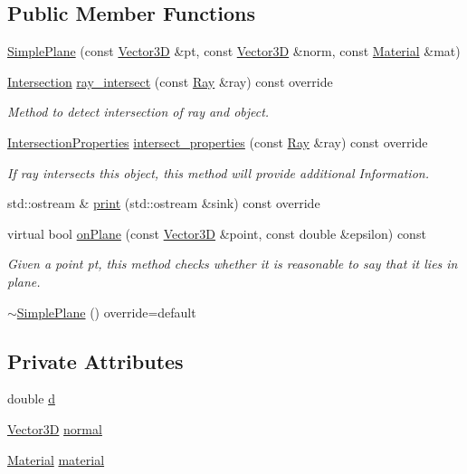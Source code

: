 \subsection*{Public Member Functions}
\begin{DoxyCompactItemize}
\item 
\hyperlink{classSimplePlane_a4536573a977f9d4c30334f9c4aab6a1d}{Simple\+Plane} (const \hyperlink{classVector3D}{Vector3D} \&pt, const \hyperlink{classVector3D}{Vector3D} \&norm, const \hyperlink{classMaterial}{Material} \&mat)
\item 
\hyperlink{classIntersection}{Intersection} \hyperlink{classSimplePlane_adffd7f102bed30d44cd527cb34a3a312}{ray\+\_\+intersect} (const \hyperlink{classRay}{Ray} \&ray) const override
\begin{DoxyCompactList}\small\item\em Method to detect intersection of ray and object. \end{DoxyCompactList}\item 
\hyperlink{classIntersectionProperties}{Intersection\+Properties} \hyperlink{classSimplePlane_a29180f657d6932226dc91ebe92143608}{intersect\+\_\+properties} (const \hyperlink{classRay}{Ray} \&ray) const override
\begin{DoxyCompactList}\small\item\em If ray intersects this object, this method will provide additional Information. \end{DoxyCompactList}\item 
std\+::ostream \& \hyperlink{classSimplePlane_afc8014126bb264e11e7b2b470a8a90a1}{print} (std\+::ostream \&sink) const override
\item 
virtual bool \hyperlink{classSimplePlane_a74bbd8b10263fe1df821d8479f1ab5ef}{on\+Plane} (const \hyperlink{classVector3D}{Vector3D} \&point, const double \&epsilon) const 
\begin{DoxyCompactList}\small\item\em Given a point pt, this method checks whether it is reasonable to say that it lies in plane. \end{DoxyCompactList}\item 
\hyperlink{classSimplePlane_abc63c5079688f3d1826a7f2ed5f9db3f}{$\sim$\+Simple\+Plane} () override=default
\end{DoxyCompactItemize}
\subsection*{Private Attributes}
\begin{DoxyCompactItemize}
\item 
double \hyperlink{classSimplePlane_a84850a97b34a8616c7ffdd51c30a5dc9}{d}
\item 
\hyperlink{classVector3D}{Vector3D} \hyperlink{classSimplePlane_a222f5d12aed966bc2764abc90b622037}{normal}
\item 
\hyperlink{classMaterial}{Material} \hyperlink{classSimplePlane_a04307eae806daa2cd2f1c471224b44cf}{material}
\end{DoxyCompactItemize}


